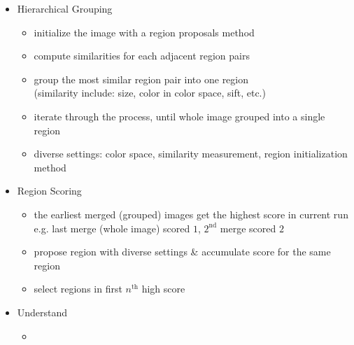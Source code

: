 \begin{itemize}
\begin{itemize}
\begin{itemize}
		\end{itemize}
	\item Hierarchical Grouping
		\begin{itemize}
		\item initialize the image with a region proposals method
		\item compute similarities for each adjacent region pairs
		\item group the most similar region pair into one region \\
		(similarity include: size, color in color space, sift, etc.)
		\item iterate through the process, until whole image grouped into a single region
		\item diverse settings: color space, similarity measurement, region initialization method
		\end{itemize}
	\item Region Scoring
		\begin{itemize}
		\item the earliest merged (grouped) images get the highest score in current run \\
		e.g. last merge (whole image) scored $1$, $2^\text{nd}$ merge scored $2$
		\item propose region with diverse settings \& accumulate score for the same region
		\item select regions in first $n^\text{th}$ high score
		\end{itemize}
	\item Understand
		\begin{itemize}
		\item 
		\end{itemize}
	\end{itemize}
\end{itemize}

